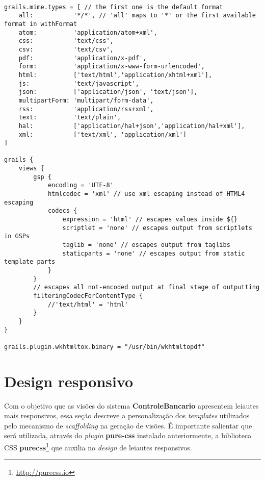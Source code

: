 \begin{lstlisting}[caption={\bf    Config.groovy},    frame=trBL,    float=htbp,
    label=codConfig]

grails.mime.types = [ // the first one is the default format
    all:           '*/*', // 'all' maps to '*' or the first available format in withFormat
    atom:          'application/atom+xml',
    css:           'text/css',
    csv:           'text/csv',
    pdf:           'application/x-pdf',
    form:          'application/x-www-form-urlencoded',
    html:          ['text/html','application/xhtml+xml'],
    js:            'text/javascript',
    json:          ['application/json', 'text/json'],
    multipartForm: 'multipart/form-data',
    rss:           'application/rss+xml',
    text:          'text/plain',
    hal:           ['application/hal+json','application/hal+xml'],
    xml:           ['text/xml', 'application/xml']
]

grails {
    views {
        gsp {
            encoding = 'UTF-8'
            htmlcodec = 'xml' // use xml escaping instead of HTML4 escaping
            codecs {
                expression = 'html' // escapes values inside ${}
                scriptlet = 'none' // escapes output from scriptlets in GSPs
                taglib = 'none' // escapes output from taglibs
                staticparts = 'none' // escapes output from static template parts
            }
        }
        // escapes all not-encoded output at final stage of outputting
        filteringCodecForContentType {
            //'text/html' = 'html'
        }
    }
}
 
grails.plugin.wkhtmltox.binary = "/usr/bin/wkhtmltopdf"
\end{lstlisting}

\section{Design responsivo}

\vspace{0.3cm}

Com  o objetivo  que  as  visões do  sistema  {\bf ControleBancario}  apresentem
leiautes  mais  responsivos,  essa  seção  descreve a  personalização  dos  {\it
  templates}  utilizados  pelo mecanismo  de  {\it  scaffolding}  na geração  de
visões.  É importante salientar que será utilizada, através do {\it plugin} {\bf
  pure-css}     instalado    anteriormente,     a     biblioteca    CSS     {\bf
  purecss}\footnote{\url{http://purecss.io}}  que  auxilia  no {\it  design}  de
leiautes responsivos.  

